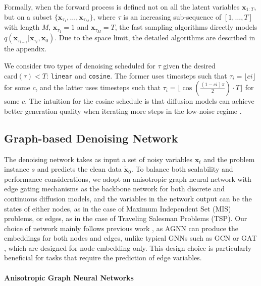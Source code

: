 \documentclass{article}
\theoremstyle{plain}
\theoremstyle{definition}
\theoremstyle{remark}
\begin{document}
Formally, when the forward process is defined not  on all the latent variables $\mathbf{x}_{1:T}$, but on a subset $\{\mathbf{x}_{\tau_1}, \dots, \mathbf{x}_{\tau_M}\}$, where $\tau$ is an increasing sub-sequence of $[1, \dots, T]$ with length $M$, $\mathbf{x}_{\tau_1} = 1$ and $\mathbf{x}_{\tau_M} = T$, the fast sampling algorithms directly models $q(\mathbf{x}_{\tau_{i-1}}|\mathbf{x}_{\tau_{i}}, \mathbf{x}_0)$. Due to the space limit, the detailed algorithms are described in the appendix.

We consider two types of denoising scheduled for $\tau$ given the desired $\mathrm{card}(\tau) < T$: \texttt{linear} and \texttt{cosine}. The former uses timesteps such that $\tau_i = \lfloor ci \rfloor$ for some $c$, and the latter uses timesteps such that ${\tau_i = \lfloor \cos(\frac{(1 - ci)\pi}{2}) \cdot T\rfloor}$ for some $c$. The intuition for the cosine schedule is that diffusion models can achieve better generation quality when iterating more steps in the low-noise regime \citep{nichol2021improved,yu2022magvit,chang2022maskgit}.  





\subsection{Graph-based Denoising Network} \label{sec:agnn}

The denoising network takes as input a set of noisy variables $\mathbf{x}_t$ and the problem instance $s$ and predicts the clean data $\widetilde{\mathbf{x}}_0$. To balance both scalability and performance considerations, we adopt an anisotropic graph neural network with edge gating mechanisms \citep{bresson2018experimental,joshi2022learning} as the backbone network for both discrete and continuous diffusion models, and the variables in the network output can be the states of either nodes, as in the case of Maximum Independent Set (MIS) problems, or edges, as in the case of Traveling Salesman Problems (TSP). Our choice of network mainly follows previous work \citep{joshi2022learning,qiudimes}, as AGNN can produce the embeddings for both nodes and edges, unlike typical GNNs such as GCN \citep{kipf2017semisupervised} or GAT \citep{velivckovic2018graph}, which are designed for node embedding only. This design choice is particularly beneficial for tasks that require the prediction of edge variables.

\paragraph{Anisotropic Graph Neural Networks}
\end{document}

